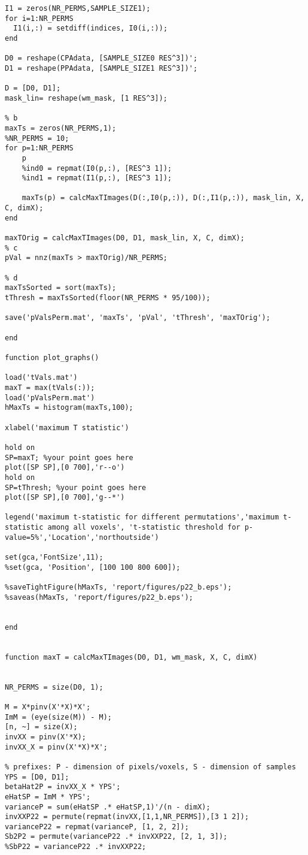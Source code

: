 \documentclass[11pt,a4paper,oneside]{report}
\begin{document}
\begin{lstlisting}
I1 = zeros(NR_PERMS,SAMPLE_SIZE1);
for i=1:NR_PERMS
  I1(i,:) = setdiff(indices, I0(i,:));
end

D0 = reshape(CPAdata, [SAMPLE_SIZE0 RES^3])';
D1 = reshape(PPAdata, [SAMPLE_SIZE1 RES^3])';

D = [D0, D1];
mask_lin= reshape(wm_mask, [1 RES^3]);

% b
maxTs = zeros(NR_PERMS,1);
%NR_PERMS = 10;
for p=1:NR_PERMS
    p
    %ind0 = repmat(I0(p,:), [RES^3 1]);
    %ind1 = repmat(I1(p,:), [RES^3 1]);
    
    maxTs(p) = calcMaxTImages(D(:,I0(p,:)), D(:,I1(p,:)), mask_lin, X, C, dimX);
end

maxTOrig = calcMaxTImages(D0, D1, mask_lin, X, C, dimX);
% c
pVal = nnz(maxTs > maxTOrig)/NR_PERMS;

% d
maxTsSorted = sort(maxTs);
tThresh = maxTsSorted(floor(NR_PERMS * 95/100));

save('pValsPerm.mat', 'maxTs', 'pVal', 'tThresh', 'maxTOrig');

end

function plot_graphs()

load('tVals.mat')
maxT = max(tVals(:));
load('pValsPerm.mat')
hMaxTs = histogram(maxTs,100);

xlabel('maximum T statistic')

hold on 
SP=maxT; %your point goes here 
plot([SP SP],[0 700],'r--o')
hold on 
SP=tThresh; %your point goes here 
plot([SP SP],[0 700],'g--*')

legend('maximum t-statistic for different permutations','maximum t-statistic among all voxels', 't-statistic threshold for p-value=5%','Location','northoutside')

set(gca,'FontSize',11);
%set(gca, 'Position', [100 100 800 600]);

%saveTightFigure(hMaxTs, 'report/figures/p22_b.eps');
%saveas(hMaxTs, 'report/figures/p22_b.eps');


end


function maxT = calcMaxTImages(D0, D1, wm_mask, X, C, dimX)


NR_PERMS = size(D0, 1);

M = X*pinv(X'*X)*X';
ImM = (eye(size(M)) - M);
[n, ~] = size(X);
invXX = pinv(X'*X);
invXX_X = pinv(X'*X)*X';

% prefixes: P - dimension of pixels/voxels, S - dimension of samples
YPS = [D0, D1];
betaHat2P = invXX_X * YPS';
eHatSP = ImM * YPS';
varianceP = sum(eHatSP .* eHatSP,1)'/(n - dimX);
invXXP22 = permute(repmat(invXX,[1,1,NR_PERMS]),[3 1 2]);
varianceP22 = repmat(varianceP, [1, 2, 2]);
Sb2P2 = permute(varianceP22 .* invXXP22, [2, 1, 3]);
%SbP22 = varianceP22 .* invXXP22;


\end{lstlisting}
\end{document}
